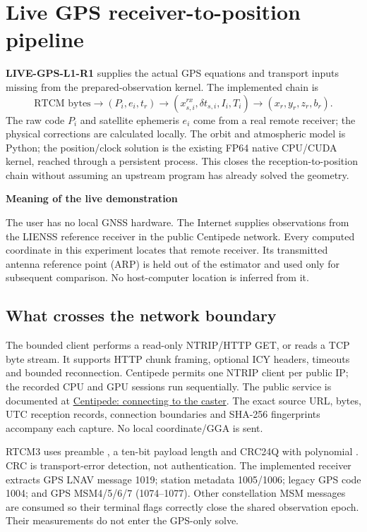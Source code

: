 \section{Live GPS receiver-to-position pipeline}
\label{sec:live}
\textbf{LIVE-GPS-L1-R1} supplies the actual GPS equations and transport inputs
missing from the prepared-observation kernel. The implemented chain is
\begin{equation}
\text{RTCM bytes}\longrightarrow(P_i,e_i,t_r)
\longrightarrow(x_{s,i}^{rx},\delta t_{s,i},I_i,T_i)
\longrightarrow(x_r,y_r,z_r,b_r).
\end{equation}
The raw code $P_i$ and satellite ephemeris $e_i$ come from a real remote receiver;
the physical corrections are calculated locally. The orbit and atmospheric model
is Python; the position/clock solution is the existing FP64 native CPU/CUDA
kernel, reached through a persistent process. This closes the reception-to-position
chain without assuming an upstream program has already solved the geometry.

\begin{panel}
\textbf{Meaning of the live demonstration}\par
The user has no local GNSS hardware. The Internet supplies observations from
the LIENSS reference receiver in the public Centipede network. Every computed
coordinate in this experiment locates that remote receiver. Its transmitted
antenna reference point (ARP) is held out of the estimator and used only for
subsequent comparison. No host-computer location is inferred from it.
\end{panel}

\subsection{What crosses the network boundary}
The bounded client performs a read-only NTRIP/HTTP GET, or reads a TCP byte stream.
It supports HTTP chunk framing, optional ICY headers, timeouts and bounded
reconnection. Centipede permits one NTRIP client per public IP; the recorded
CPU and GPU sessions run sequentially. The public service is documented at
\href{https://docs.centipede.fr/docs/centipede/3_connect_caster.html}{Centipede: connecting to the caster}.
The exact source URL, bytes, UTC reception records, connection boundaries and
SHA-256 fingerprints accompany each capture. No local coordinate/GGA is sent.

RTCM3 uses preamble , a ten-bit payload length and CRC24Q with
polynomial . CRC is transport-error detection, not authentication.
The implemented receiver extracts GPS LNAV message 1019; station metadata
1005/1006; legacy GPS code 1004; and GPS MSM4/5/6/7 (1074--1077). Other
constellation MSM messages are consumed so their terminal flags correctly close
the shared observation epoch. Their measurements do not enter the GPS-only solve.

